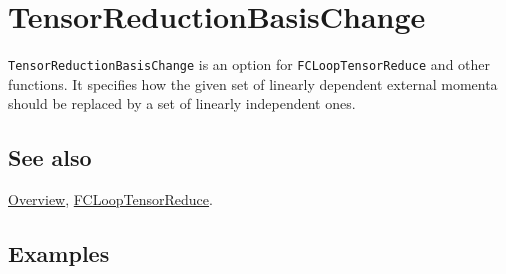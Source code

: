 \documentclass[../FeynCalcManual.tex]{subfiles}
\begin{document}
\hypertarget{tensorreductionbasischange}{
\section{TensorReductionBasisChange}\label{tensorreductionbasischange}}

\texttt{TensorReductionBasisChange} is an option for
\texttt{FCLoopTensorReduce} and other functions. It specifies how the
given set of linearly dependent external momenta should be replaced by a
set of linearly independent ones.

\subsection{See also}

\hyperlink{toc}{Overview},
\hyperlink{fclooptensorreduce}{FCLoopTensorReduce}.

\subsection{Examples}
\end{document}
